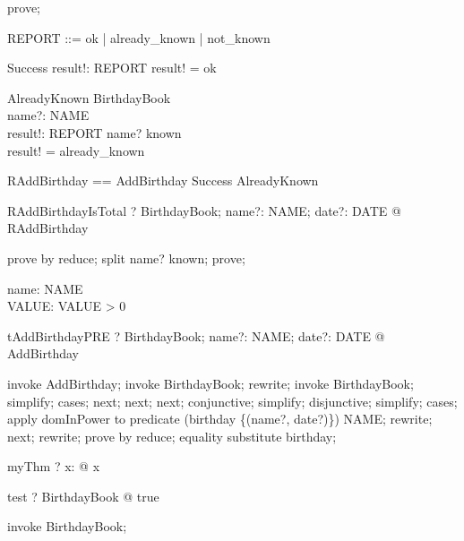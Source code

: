 \begin{zproof}
prove;
\end{zproof}

\begin{zed}
REPORT ::= ok | already\_known | not\_known
\end{zed}

\begin{schema}{Success}
  result!: REPORT
\where
  result! = ok
\end{schema}

\begin{schema}{AlreadyKnown}
  \Xi BirthdayBook\\
  name?: NAME\\
  result!: REPORT
\where
  name? \in  known\\
  result! = already\_known
\end{schema}

\begin{zed}
RAddBirthday == AddBirthday \land  Success \lor  AlreadyKnown
\end{zed}

\begin{theorem}{RAddBirthdayIsTotal}
\vdash? \forall  BirthdayBook; name?: NAME; date?: DATE @ \pre  RAddBirthday
\end{theorem}

\begin{zproof}[RAddBirthdayIsTotal]
prove by reduce;
split name? \in  known;
prove;
\end{zproof}

\begin{axdef}
  name: NAME\\
  VALUE: \nat
\where
  VALUE > 0
\end{axdef}

\begin{theorem}{tAddBirthdayPRE}
\vdash? \forall  BirthdayBook; name?: NAME; date?: DATE @ \pre  AddBirthday
\end{theorem}

\begin{zproof}[tAddBirthdayPRE]
invoke AddBirthday;
invoke \Delta BirthdayBook;
rewrite;
invoke BirthdayBook;
simplify;
cases;
next;
next;
next;
conjunctive;
simplify;
disjunctive;
simplify;
cases;
apply domInPower to predicate \dom  (birthday \cup  \{(name?, date?)\}) \in  \power  NAME;
rewrite;
next;
rewrite;
prove by reduce;
equality substitute \dom  birthday;
\end{zproof}

\begin{theorem}{myThm}
\vdash? \forall  x: \nat  @ x 
\end{theorem}

\begin{theorem}{test}
\vdash? \forall BirthdayBook @ true
\end{theorem}

\begin{zproof}[test]
invoke BirthdayBook;
\end{zproof}

